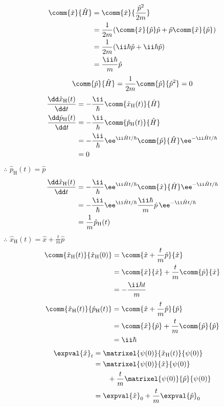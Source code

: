 \begin{align*}
\comm{\hat{x}}{\hat{H}}&=\comm{\hat{x}}{\frac{\hat{p}^{2}}{2m}}\\
&=\frac{1}{2m}(\comm{\hat{x}}{\hat{p}}\hat{p}+\hat{p}\comm{\hat{x}}{\hat{p}})\\
&=\frac{1}{2m}(\ii\hbar\hat{p}+\ii\hbar\hat{p})\\
&=\frac{\ii\hbar}{m}\hat{p}
\end{align*}
\[ \comm{\hat{p}}{\hat{H}}=\frac{1}{2m}\comm{\hat{p}}{\hat{p}^{2}}=0 \]
\begin{align*}
\frac{\dd\hat{x}_{\mathrm{H}}(t)}{\dd t}&=-\frac{\ii}{\hbar}\comm{\hat{x}_{\mathrm{H}}(t)}{\hat{H}}\\
\frac{\dd\hat{p}_{\mathrm{H}}(t)}{\dd t}&=-\frac{\ii}{\hbar}\comm{\hat{p}_{\mathrm{H}}(t)}{\hat{H}}\\
&=-\frac{\ii}{\hbar}\ee^{\ii\hat{H}t/\hbar}\comm{\hat{p}}{\hat{H}}\ee^{-\ii\hat{H}t/\hbar}\\
&=0
\end{align*}
$\therefore$ $\hat{p}_{\mathrm{H}}(t)=\hat{p}$
\begin{align*}
\frac{\dd\hat{x}_{\mathrm{H}}(t)}{\dd t}&=-\frac{\ii}{\hbar}\ee^{\ii\hat{H}t/\hbar}\comm{\hat{x}}{\hat{H}}\ee^{-\ii\hat{H}t/\hbar}\\
&=-\frac{\ii}{\hbar}\ee^{\ii\hat{H}t/\hbar}\frac{\ii\hbar}{m}\hat{p}\,\ee^{-\ii\hat{H}t/\hbar}\\
&=\frac{1}{m}\hat{p}_{\mathrm{H}}(t)
\end{align*}
$\therefore$ $\hat{x}_{\mathrm{H}}(t)=\hat{x}+\frac{t}{m}\hat{p}$
\begin{align*}
\comm{\hat{x}_{\mathrm{H}}(t)}{\hat{x}_{\mathrm{H}}(0)}&=\comm{\hat{x}+\frac{t}{m}\hat{p}}{\hat{x}}\\
&=\comm{\hat{x}}{\hat{x}}+\frac{t}{m}\comm{\hat{p}}{\hat{x}}\\
&=-\frac{\ii\hbar t}{m}
\end{align*}
\begin{align*}
\comm{\hat{x}_{\mathrm{H}}(t)}{\hat{p}_{\mathrm{H}}(t)}&=\comm{\hat{x}+\frac{t}{m}\hat{p}}{\hat{p}}\\
&=\comm{\hat{x}}{\hat{p}}+\frac{t}{m}\comm{\hat{p}}{\hat{p}}\\
&=\ii\hbar
\end{align*}
\begin{align*}
\expval{\hat{x}}_{t}&=\matrixel{\psi(0)}{\hat{x}_{\mathrm{H}}(t)}{\psi(0)}\\
&=\matrixel{\psi(0)}{\hat{x}}{\psi(0)}\\
&\qquad+\frac{t}{m}\matrixel{\psi(0)}{\hat{p}}{\psi(0)}\\
&=\expval{\hat{x}}_{0}+\frac{t}{m}\expval{\hat{p}}_{0}
\end{align*}
